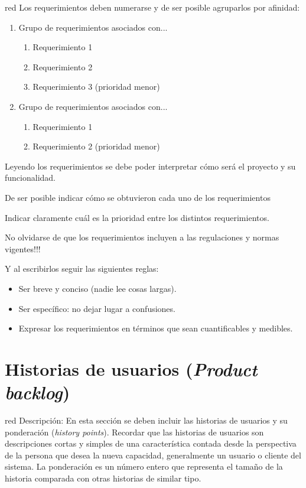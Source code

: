 \documentclass[11pt]{charter}
\begin{document}
\begin{consigna}{red}
Los requerimientos deben numerarse y de ser posible agruparlos por afinidad:

\begin{enumerate}
\item Grupo de requerimientos asociados con...
	\begin{enumerate}
	\item Requerimiento 1
	\item Requerimiento 2
	\item Requerimiento 3 (prioridad menor)
	\end{enumerate}
\item Grupo de requerimientos asociados con...
	\begin{enumerate}
	\item Requerimiento 1
	\item Requerimiento 2 (prioridad menor)
	\end{enumerate}
\end{enumerate}

Leyendo los requerimientos se debe poder interpretar cómo será el proyecto y su funcionalidad.

De ser posible indicar cómo se obtuvieron cada uno de los requerimientos 

Indicar claramente cuál es la prioridad entre los distintos requerimientos. 

No olvidarse de que los requerimientos incluyen a las regulaciones y normas vigentes!!!

Y al escribirlos seguir las siguientes reglas:
\begin{itemize}
\item Ser breve y conciso (nadie lee cosas largas). 
\item Ser específico: no dejar lugar a confusiones.
\item Expresar los requerimientos en términos que sean cuantificables y medibles.
\end{itemize}

\end{consigna}

\section{Historias de usuarios (\textit{Product backlog})}
\label{sec:backlog}

\begin{consigna}{red}
Descripción: En esta sección se deben incluir las historias de usuarios y su ponderación (\textit{history points}). Recordar que las historias de usuarios son descripciones cortas y simples de una característica contada desde la perspectiva de la persona que desea la nueva capacidad, generalmente un usuario o cliente del sistema. La ponderación es un número entero que representa el tamaño de la historia comparada con otras historias de similar tipo.
\end{consigna}
\end{document}
